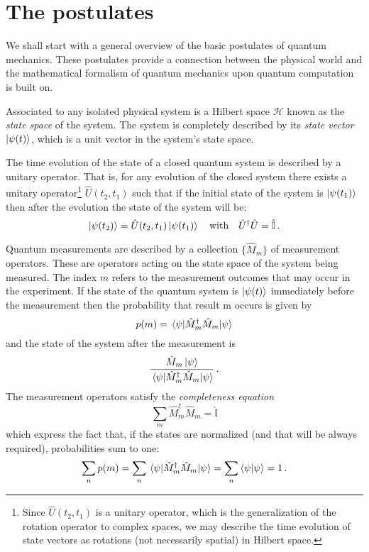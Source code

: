 \section{The postulates}
We shall start with a general overview of the basic postulates of quantum mechanics. These postulates provide a connection between the physical world and the mathematical formalism of quantum mechanics upon quantum computation is built on.
\begin{postulate}\label{postulate:1}
Associated to any isolated physical system is a Hilbert space $\mathcal{H}$ known as the \emph{state space} of the
system. The system is completely described by its \emph{state vector} $\ket{\psi(t)}$, which is a unit
vector in the system’s state space.
\end{postulate}
\begin{postulate}\label{postulate:2}
The time evolution of the state of a closed quantum system is described by a
unitary operator. That is, for any evolution of the closed system there exists
a unitary operator\footnote{Since $\widehat{U}(t_2,t_1)$ is a unitary operator, which is the generalization of the rotation operator to complex spaces, we may describe the time evolution of state vectors as rotations (not necessarily spatial) in Hilbert space.} $\widehat{U}(t_2,t_1)$ such that if the initial state of the system is $\ket{\psi(t_1)}$ then
after the evolution the state of the system will be:
\begin{equation*}
    \ket{\psi(t_2)} = \hat{U}(t_2,t_1) \ket{\psi(t_1)} \quad \text{with} \quad \hat{U}^\dagger\hat{U} = \hat{\mathbb{I}}\,.
\end{equation*}
\end{postulate}
\begin{postulate}\label{postulate:3}
Quantum measurements are described by a collection $\{\hat{M}_m\}$ of
measurement operators. These are operators acting on the state space of the
system being measured. The index $m$ refers to the measurement outcomes that
may occur in the experiment. If the state of the quantum system is $\ket{\psi(t)}$
immediately before the measurement then the probability that result m occurs is given by
\begin{equation*}
    p(m) = \expval{\hat{M}^\dagger_m \hat{M}_m}{\psi}
\end{equation*}
and the state of the system after the measurement is
\begin{equation*}
    \frac{\hat{M}_m\ket{\psi}}{\expval{\hat{M}^\dagger_m \hat{M}_m}{\psi}}\,.
\end{equation*}
The measurement operators satisfy the \emph{completeness equation}
\begin{equation*}
    \sum_m \hat{M}_m^\dagger \hat{M}_m = \hat{\mathbb{I}}
\end{equation*}
which express the fact that, if the states are normalized (and that will be always required), probabilities sum to one: 
    \begin{equation}\label{eq:normalization}
    \sum_n p(m) = \sum_n \expval{\hat{M}^\dagger_m \hat{M}_m}{\psi} = \sum_n \braket{\psi} = 1\,.
    \end{equation}
\end{postulate} 

